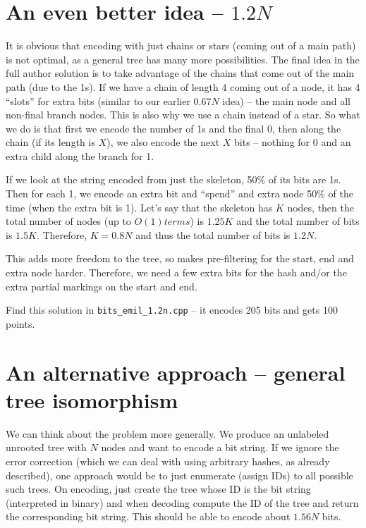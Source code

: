 \documentclass[12pt]{article}
\begin{document}
\section*{An even better idea -- $1.2 N$}

It is obvious that encoding with just chains or stars (coming out of a main path) is not optimal, as a general tree has many more possibilities. The final idea in the full author solution is to take advantage of the chains that come out of the main path (due to the 1s). If we have a chain of length 4 coming out of a node, it has 4 ``slots'' for extra bits (similar to our earlier $0.67 N$ idea) -- the main node and all non-final branch nodes. This is also why we use a chain instead of a star. So what we do is that first we encode the number of 1s and the final 0, then along the chain (if its length is $X$), we also encode the next $X$ bits -- nothing for 0 and an extra child along the branch for 1.

If we look at the string encoded from just the skeleton, 50\% of its bits are 1s. Then for each 1, we encode an extra bit and ``spend'' and extra node 50\% of the time (when the extra bit is 1). Let's say that the skeleton has $K$ nodes, then the total number of nodes (up to $O(1) terms$) is $1.25 K$ and the total number of bits is $1.5 K$. Therefore, $K = 0.8 N$ and thus the total number of bits is $1.2 N$.

This adds more freedom to the tree, so makes pre-filtering for the start, end and extra node harder. Therefore, we need a few extra bits for the hash and/or the extra partial markings on the start and end. 

Find this solution in \verb|bits_emil_1.2n.cpp| -- it encodes 205 bits and gets 100 points.

\section*{An alternative approach -- general tree isomorphism}

We can think about the problem more generally. We produce an unlabeled unrooted tree with $N$ nodes and want to encode a bit string. If we ignore the error correction (which we can deal with using arbitrary hashes, as already described), one approach would be to just enumerate (assign IDs) to all possible such trees. On encoding, just create the tree whose ID is the bit string (interpreted in binary) and when decoding compute the ID of the tree and return the corresponding bit string. This should be able to encode about $1.56 N$ bits.
\end{document}

